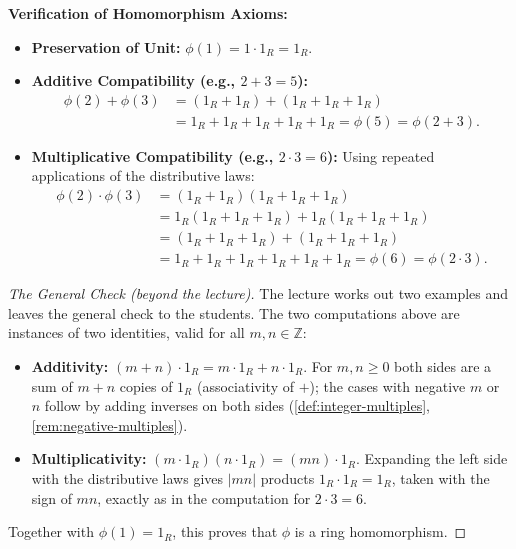 \begin{content}

\textbf{Verification of Homomorphism Axioms:}
\begin{itemize}
    \item \textbf{Preservation of Unit:} $\phi(1) = 1 \cdot 1_R = 1_R$.
    \item \textbf{Additive Compatibility (e.g., $2 + 3 = 5$):}
    \begin{align*}
    \phi(2) + \phi(3) &= (1_R + 1_R) + (1_R + 1_R + 1_R) \\
    &= 1_R + 1_R + 1_R + 1_R + 1_R = \phi(5) = \phi(2 + 3).
    \end{align*}
    \item \textbf{Multiplicative Compatibility (e.g., $2 \cdot 3 = 6$):}
    Using repeated applications of the distributive laws:
    \begin{align*}
    \phi(2) \cdot \phi(3) &= (1_R + 1_R)(1_R + 1_R + 1_R) \\
    &= 1_R(1_R + 1_R + 1_R) + 1_R(1_R + 1_R + 1_R) \\
    &= (1_R + 1_R + 1_R) + (1_R + 1_R + 1_R) \\
    &= 1_R + 1_R + 1_R + 1_R + 1_R + 1_R = \phi(6) = \phi(2 \cdot 3).
    \end{align*}
\end{itemize}

\begin{proof}[The General Check (beyond the lecture)]
The lecture works out two examples and leaves the general check to the students. The two computations above are instances of two identities, valid for all $m, n \in \mathbb{Z}$:
\begin{itemize}
    \item \textbf{Additivity:} $(m + n) \cdot 1_R = m \cdot 1_R + n \cdot 1_R$. For $m, n \ge 0$ both sides are a sum of $m + n$ copies of $1_R$ (associativity of $+$); the cases with negative $m$ or $n$ follow by adding inverses on both sides (\cref{def:integer-multiples}, \cref{rem:negative-multiples}).
    \item \textbf{Multiplicativity:} $(m \cdot 1_R)(n \cdot 1_R) = (mn) \cdot 1_R$. Expanding the left side with the distributive laws gives $|mn|$ products $1_R \cdot 1_R = 1_R$, taken with the sign of $mn$, exactly as in the computation for $2 \cdot 3 = 6$.
\end{itemize}
Together with $\phi(1) = 1_R$, this proves that $\phi$ is a ring homomorphism.
\end{proof}

\end{content}

